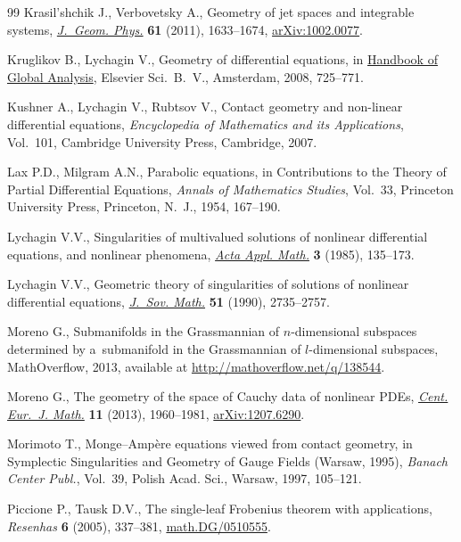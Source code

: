 \documentclass[pdftex]{sigma}
\numberwithin{equation}{section}
\begin{document}
\begin{thebibliography}{99}
Krasil'shchik J., Verbovetsky A., Geometry of jet spaces and integrable
 systems, \href{http://dx.doi.org/10.1016/j.geomphys.2010.10.012}{\textit{J.~Geom. Phys.}} \textbf{61} (2011), 1633--1674,
 \href{http://arxiv.org/abs/1002.0077}{arXiv:1002.0077}.

Kruglikov B., Lychagin V., Geometry of dif\/ferential equations, in \href{http://dx.doi.org/10.1016/B978-044452833-9.50015-2}{Handbook of
 Global Analysis}, Elsevier Sci.~B.~V., Amsterdam, 2008, 725--771.

Kushner A., Lychagin V., Rubtsov V., Contact geometry and non-linear
 dif\/ferential equations, \textit{Encyclopedia of Mathematics and its
 Applications}, Vol.~101, Cambridge University Press, Cambridge, 2007.

Lax P.D., Milgram A.N., Parabolic equations, in Contributions to the Theory of
 Partial Dif\/ferential Equations, \textit{Annals of Mathematics Studies},
 Vol.~33, Princeton University Press, Princeton, N.~J., 1954, 167--190.

Lychagin V.V., Singularities of multivalued solutions of nonlinear dif\/ferential
 equations, and nonlinear phenomena, \href{http://dx.doi.org/10.1007/BF00580702}{\textit{Acta Appl. Math.}} \textbf{3}
 (1985), 135--173.

Lychagin V.V., Geometric theory of singularities of solutions of nonlinear
 dif\/ferential equations, \href{http://dx.doi.org/10.1007/BF01095431}{\textit{J.~Sov. Math.}} \textbf{51} (1990),
 2735--2757.

Moreno G., Submanifolds in the Grassmannian of $n$-dimensional subspaces
 determined by a~sub\-ma\-ni\-fold in the Grassmannian of $l$-dimensional subspaces,
 MathOverf\/low, 2013, available at \url{http://mathoverflow.net/q/138544}.

Moreno G., The geometry of the space of {C}auchy data of nonlinear {PDE}s,
 \href{http://dx.doi.org/10.2478/s11533-013-0292-y}{\textit{Cent. Eur.~J. Math.}} \textbf{11} (2013), 1960--1981,
 \href{http://arxiv.org/abs/1207.6290}{arXiv:1207.6290}.

Morimoto T., Monge--{A}mp\`ere equations viewed from contact geometry, in
 Symplectic Singularities and Geometry of Gauge Fields ({W}arsaw, 1995),
 \textit{Banach Center Publ.}, Vol.~39, Polish Acad. Sci., Warsaw, 1997,
 105--121.

Piccione P., Tausk D.V., The single-leaf {F}robenius theorem with applications,
 \textit{Resenhas} \textbf{6} (2005), 337--381, \href{http://arxiv.org/abs/math.DG/0510555}{math.DG/0510555}.


\end{thebibliography}
\end{document}
